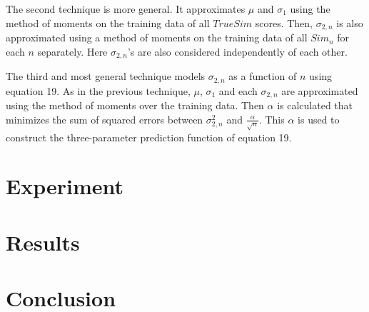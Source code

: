 \documentclass[11pt]{article}
\begin{document}
The second technique is more general. It approximates $\mu$ and $\sigma_{1}$
using the method of moments on the training data of all $TrueSim$ scores. Then,
$\sigma_{2,n}$ is also approximated using a method of moments on the training
data of all $Sim_n$ for each $n$ separately. Here $\sigma_{2,n}$'s are also
considered independently of each other.

The third and most general technique models $\sigma_{2,n}$ as a function of
$n$ using equation 19. As in the previous technique, $\mu$, $\sigma_{1}$ and each
$\sigma_{2,n}$ are approximated using the method of moments over the training
data. Then $\alpha$ is calculated that minimizes the sum of squared errors
between $\sigma_{2,n}^2$ and $\frac{\alpha}{\sqrt{n}}$. This $\alpha$ is used to
construct the three-parameter prediction function of equation 19.

\section*{Experiment}

\section*{Results}

\section*{Conclusion}
\end{document}
